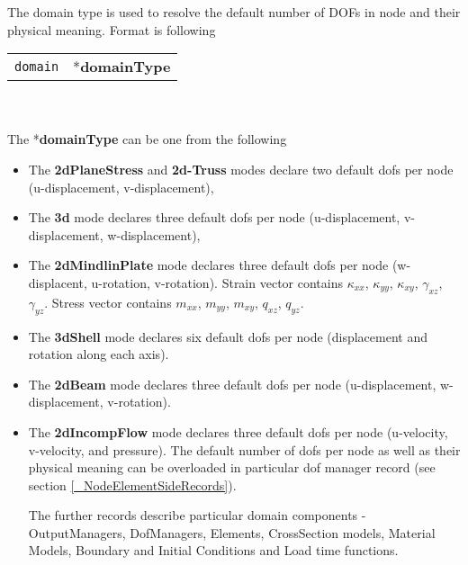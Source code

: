 \documentclass[a4paper]{article}
\newcommand{\param}[1]{\texttt{#1}} %
\newcommand{\fieldnotype}[1]{\param{#1}}
\newcommand{\entKeyword}[1]{*\textbf{#1}} %
\newcommand{\entKeywordInst}[1]{\textbf{#1}} %
\newenvironment{record}[1][]{\begin{tabular}{|ll}}{\end{tabular}\\}
\newcommand{\recentry}[2]{{#1}&{#2}\\}
\newcounter{rcc}
\newenvironment{record}[1][\textwidth]{\setcounter{rcc}{0}\rowcolors{1}{lightgray}{lightgray}\tabularx{#1}{llR} \hline}
               {\endtabularx}
\newcommand{\recentry}[2]{\ifthenelse{\value{rcc}>0}{$\backslash$ \\}{\setcounter{rcc}{1}}{#1}&{#2}&}
\begin{document}
The domain type is used to resolve the
default number of DOFs in node and their physical meaning. Format is following\\
\begin{record}
  \recentry{\fieldnotype{domain}}{\entKeyword{domainType}}
\end{record}\\
The \entKeyword{domainType} can be one from the following
\begin{itemize}
\item The \entKeywordInst{2dPlaneStress} and \entKeywordInst{2d-Truss}
modes declare two default dofs per node (u-displacement, v-displacement),
\item The \entKeywordInst{3d} mode declares three default dofs per
node (u-displacement, v-displacement, w-displacement),
\item The \entKeywordInst{2dMindlinPlate} mode declares three default
dofs per node (w-displacent, u-rotation, v-rotation). Strain vector contains
$\kappa_{xx}$, $\kappa_{yy}$, $\kappa_{xy}$, $\gamma_{xz}$, $\gamma_{yz}$. Stress vector
contains $m_{xx}$, $m_{yy}$, $m_{xy}$, $q_{xz}$, $q_{yz}$.

\item The \entKeywordInst{3dShell} mode declares six default dofs
per node (displacement and rotation along each axis).
\item The \entKeywordInst{2dBeam} mode declares three default dofs per
node (u-displacement, w-displacement, v-rotation).
\item The \entKeywordInst{2dIncompFlow} mode declares three default
  dofs per node (u-velocity, v-velocity, and pressure).
The default number of dofs per node as well as their physical meaning
can be overloaded in particular dof manager record (see section
\ref{_NodeElementSideRecords}).

The further records describe particular domain components -
OutputManagers, DofManagers, Elements, CrossSection models, Material
Models, Boundary and Initial Conditions and Load time functions.

\end{itemize}
\end{document}
